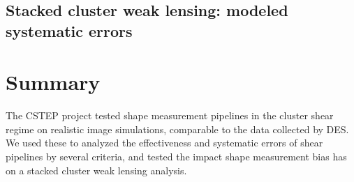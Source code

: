 \documentclass[useAMS,usenatbib]{mn2e}
\begin{document}
\subsection{Stacked cluster weak lensing: modeled systematic errors}\label{sec:p2}


\section{Summary}
The CSTEP project tested shape measurement pipelines in the cluster
shear regime on realistic image simulations, comparable to the data collected by DES. 
We used these to analyzed the effectiveness and systematic errors of shear pipelines by several criteria,
and tested the impact shape measurement bias has on a stacked cluster weak lensing analysis. \\
\end{document}
